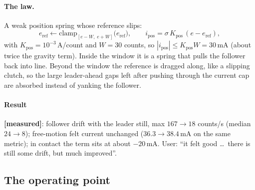 \documentclass[11pt,a4paper]{article}
\newcommand{\mA}{\,\mathrm{mA}}
\newcommand{\measured}{\textcolor{teal!70!black}{\textbf{[measured]}}}
\begin{document}
\paragraph{The law.} A weak position spring whose reference slips:
\begin{equation}
  e_{\mathrm{ref}} \leftarrow \mathrm{clamp}_{[e - W,\; e + W]}\bigl(e_{\mathrm{ref}}\bigr),
  \qquad i_{\mathrm{pos}} = \sigma\,K_{\mathrm{pos}}\,(e - e_{\mathrm{ref}}),
\end{equation}
with $K_{\mathrm{pos}} = 10^{-3}$\,A/count and $W = 30$ counts, so
$|i_{\mathrm{pos}}| \le K_{\mathrm{pos}} W = 30\mA$ (about twice the gravity
term). Inside the window it is a spring that pulls the follower back into
line. Beyond the window the reference is dragged along, like a slipping
clutch, so the large leader-ahead gaps left after pushing through the
current cap are absorbed instead of yanking the follower.

\paragraph{Result} \measured: follower drift with the leader still, max
$167 \to 18$ counts/s (median $24\to 8$); free-motion felt current
unchanged ($36.3\to 38.4\mA$ on the same metric); in contact the term sits
at about $-20\mA$. User: ``it felt good \ldots\ there is still some drift,
but much improved''.

\subsection{The operating point}
\end{document}
